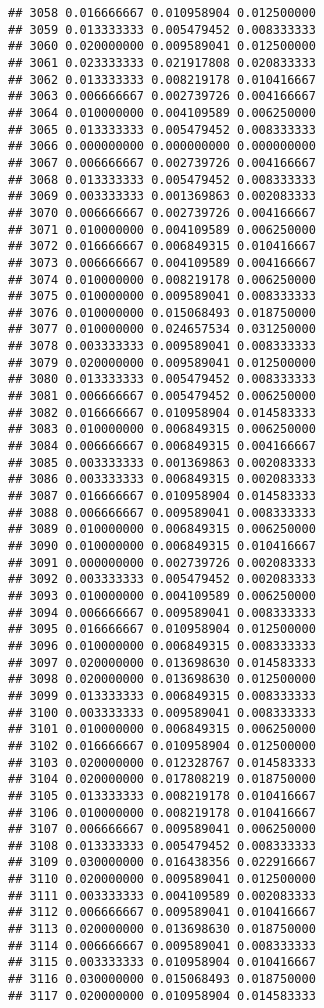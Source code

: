 \documentclass[
]{article}
\begin{document}
\begin{verbatim}
## 3058 0.016666667 0.010958904 0.012500000
## 3059 0.013333333 0.005479452 0.008333333
## 3060 0.020000000 0.009589041 0.012500000
## 3061 0.023333333 0.021917808 0.020833333
## 3062 0.013333333 0.008219178 0.010416667
## 3063 0.006666667 0.002739726 0.004166667
## 3064 0.010000000 0.004109589 0.006250000
## 3065 0.013333333 0.005479452 0.008333333
## 3066 0.000000000 0.000000000 0.000000000
## 3067 0.006666667 0.002739726 0.004166667
## 3068 0.013333333 0.005479452 0.008333333
## 3069 0.003333333 0.001369863 0.002083333
## 3070 0.006666667 0.002739726 0.004166667
## 3071 0.010000000 0.004109589 0.006250000
## 3072 0.016666667 0.006849315 0.010416667
## 3073 0.006666667 0.004109589 0.004166667
## 3074 0.010000000 0.008219178 0.006250000
## 3075 0.010000000 0.009589041 0.008333333
## 3076 0.010000000 0.015068493 0.018750000
## 3077 0.010000000 0.024657534 0.031250000
## 3078 0.003333333 0.009589041 0.008333333
## 3079 0.020000000 0.009589041 0.012500000
## 3080 0.013333333 0.005479452 0.008333333
## 3081 0.006666667 0.005479452 0.006250000
## 3082 0.016666667 0.010958904 0.014583333
## 3083 0.010000000 0.006849315 0.006250000
## 3084 0.006666667 0.006849315 0.004166667
## 3085 0.003333333 0.001369863 0.002083333
## 3086 0.003333333 0.006849315 0.002083333
## 3087 0.016666667 0.010958904 0.014583333
## 3088 0.006666667 0.009589041 0.008333333
## 3089 0.010000000 0.006849315 0.006250000
## 3090 0.010000000 0.006849315 0.010416667
## 3091 0.000000000 0.002739726 0.002083333
## 3092 0.003333333 0.005479452 0.002083333
## 3093 0.010000000 0.004109589 0.006250000
## 3094 0.006666667 0.009589041 0.008333333
## 3095 0.016666667 0.010958904 0.012500000
## 3096 0.010000000 0.006849315 0.008333333
## 3097 0.020000000 0.013698630 0.014583333
## 3098 0.020000000 0.013698630 0.012500000
## 3099 0.013333333 0.006849315 0.008333333
## 3100 0.003333333 0.009589041 0.008333333
## 3101 0.010000000 0.006849315 0.006250000
## 3102 0.016666667 0.010958904 0.012500000
## 3103 0.020000000 0.012328767 0.014583333
## 3104 0.020000000 0.017808219 0.018750000
## 3105 0.013333333 0.008219178 0.010416667
## 3106 0.010000000 0.008219178 0.010416667
## 3107 0.006666667 0.009589041 0.006250000
## 3108 0.013333333 0.005479452 0.008333333
## 3109 0.030000000 0.016438356 0.022916667
## 3110 0.020000000 0.009589041 0.012500000
## 3111 0.003333333 0.004109589 0.002083333
## 3112 0.006666667 0.009589041 0.010416667
## 3113 0.020000000 0.013698630 0.018750000
## 3114 0.006666667 0.009589041 0.008333333
## 3115 0.003333333 0.010958904 0.010416667
## 3116 0.030000000 0.015068493 0.018750000
## 3117 0.020000000 0.010958904 0.014583333

\end{verbatim}
\end{document}
